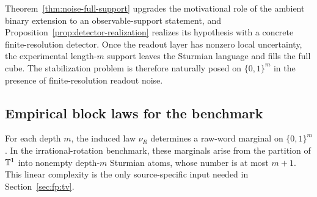 \begin{remark}
Theorem~\ref{thm:noise-full-support} upgrades the motivational role of the ambient binary extension to an observable-support statement, and Proposition~\ref{prop:detector-realization} realizes its hypothesis with a concrete finite-resolution detector. Once the readout layer has nonzero local uncertainty, the experimental length-$m$ support leaves the Sturmian language and fills the full cube. The stabilization problem is therefore naturally posed on $\{0,1\}^m$ in the presence of finite-resolution readout noise.
\end{remark}

\subsection{Empirical block laws for the benchmark}\label{sec:readout:empirical}

For each depth $m$, the induced law $\nu_R$ determines a raw-word marginal on $\{0,1\}^m$. In the irrational-rotation benchmark, these marginals arise from the partition of $\mathbb{T}^1$ into nonempty depth-$m$ Sturmian atoms, whose number is at most $m+1$. This linear complexity is the only source-specific input needed in Section~\ref{sec:fp:tv}.

